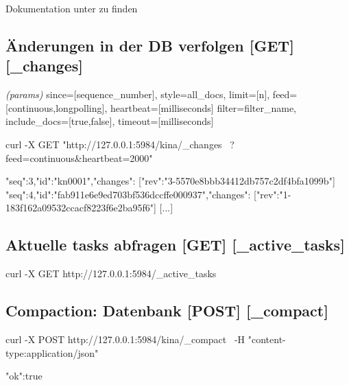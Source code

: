 \documentclass[19pt,landscape,twocolumn]{article}
\newcommand{\htmlverb}[1]{{[}\textbf{{#1}}{]}}
\newcommand{\brackets}[1]{{[}{#1}{]}}
\newcommand{\setparskip}{\setlength{\parskip}{-6mm}}
\newcommand{\resetparskip}{\setlength{\parskip}{1mm}}
\begin{document}
Dokumentation unter \cite{11} zu finden

\subsection{Änderungen in der DB verfolgen \htmlverb{GET} \htmlverb{\_changes}}
\emph{(params)} since=\brackets{sequence\_number}, style=all\_docs, limit=\brackets{n}, \newline
feed=\brackets{continuous,longpolling}, heartbeat=\brackets{milliseconds} \newline
filter=filter\_name, include\_docs=\brackets{true,false}, timeout=\brackets{milliseconds}

\begin{code}
curl -X GET "http://127.0.0.1:5984/kina/_changes \
  ?feed=continuous&heartbeat=2000"
\end{code}
\setparskip
\begin{response}
{"seq":3,"id":"kn0001","changes":
  [{"rev":"3-5570e8bbb34412db757c2df4bfa1099b"}]}
{"seq":4,"id":"fab911e6e9ed703bf536dccffe000937","changes":
  [{"rev":"1-183f162a09532ccacf8223f6e2ba95f6"}]}
[...]
\end{response}
\resetparskip

\subsection{Aktuelle tasks abfragen \htmlverb{GET} \htmlverb{\_active\_tasks}}

\begin{code}
curl -X GET http://127.0.0.1:5984/_active_tasks
\end{code}
\setparskip
\begin{response}
\end{response}
\resetparskip

\subsection{Compaction: Datenbank \htmlverb{POST} \htmlverb{\_compact}}

\begin{code}
curl -X POST http://127.0.0.1:5984/kina/_compact \
  -H "content-type:application/json"
\end{code}
\setparskip
\begin{response}
{"ok":true}
\end{response}
\resetparskip
\end{document}

